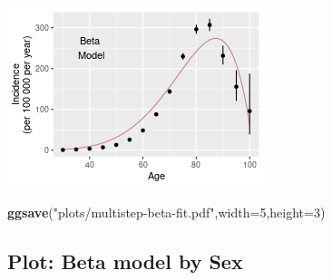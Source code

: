 \documentclass[
]{article}
\newenvironment{Shaded}{\begin{snugshade}}{\end{snugshade}}
\newcommand{\DataTypeTok}[1]{\textcolor[rgb]{0.13,0.29,0.53}{#1}}
\newcommand{\DecValTok}[1]{\textcolor[rgb]{0.00,0.00,0.81}{#1}}
\newcommand{\KeywordTok}[1]{\textcolor[rgb]{0.13,0.29,0.53}{\textbf{#1}}}
\newcommand{\NormalTok}[1]{#1}
\newcommand{\StringTok}[1]{\textcolor[rgb]{0.31,0.60,0.02}{#1}}
\begin{document}
\includegraphics{multistep-model-comparison_files/figure-latex/beta-1.png}

\begin{Shaded}
\begin{Highlighting}[]
\KeywordTok{ggsave}\NormalTok{(}\StringTok{"plots/multistep-beta-fit.pdf"}\NormalTok{,}\DataTypeTok{width=}\DecValTok{5}\NormalTok{,}\DataTypeTok{height=}\DecValTok{3}\NormalTok{)}
\end{Highlighting}
\end{Shaded}

\hypertarget{plot-beta-model-by-sex}{%
\subsection{Plot: Beta model by Sex}\label{plot-beta-model-by-sex}}
\end{document}
